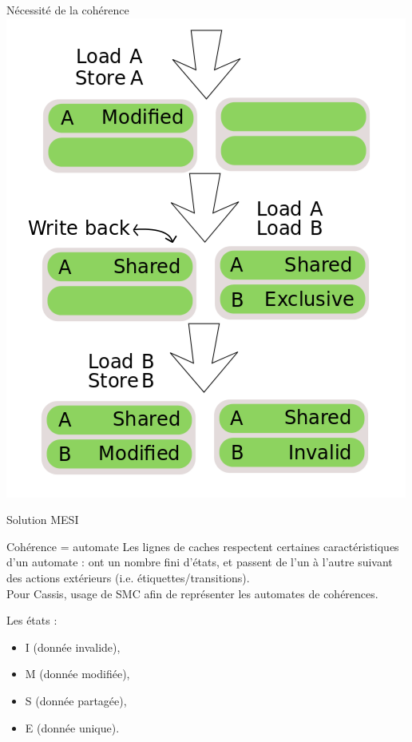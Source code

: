 \begin{frame}{Nécessité de la cohérence}
    \includegraphics[scale=.3]{images/learn_mesi_2.png}  
\end{frame}

\begin{frame}{Solution MESI}
  \begin{block}{Cohérence = automate}
    Les lignes de caches respectent certaines caractéristiques d'un automate : ont un nombre fini d'états, et passent de l'un à l'autre suivant des actions extérieurs (i.e. étiquettes/transitions).\\
    Pour \textsf{Cassis}, usage de \textsf{SMC} afin de représenter les automates de cohérences.
  \end{block}
  
  \begin{block}{Les états :}
    \begin{itemize}
    \item{I (donnée invalide),}
    \item{M (donnée modifiée),}
    \item{S (donnée partagée),}
    \item{E (donnée unique).}
    \end{itemize}
  \end{block}
\end{frame}

